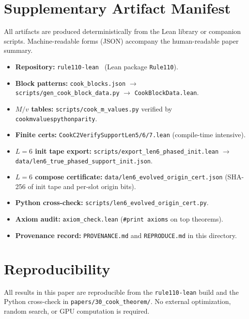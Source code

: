 \documentclass[11pt]{article}
\theoremstyle{remark}
\newcommand{\lean}[1]{%
  \penalty-100
  \begingroup\def\_{\textunderscore\allowbreak}\texttt{#1}\endgroup}
\begin{document}
\begin{appendices}
\section{Supplementary Artifact Manifest}
\label{app:artifacts}

All artifacts are produced deterministically from the Lean library or companion scripts.
Machine-readable forms (JSON) accompany the human-readable paper summary.

\begin{itemize}[leftmargin=1.2em,itemsep=0.2em]
  \item \textbf{Repository:} \texttt{rule110-lean}~\cite{rule110-lean} (Lean package \texttt{Rule110}).
  \item \textbf{Block patterns:} \texttt{cook\_blocks.json} $\to$\\
    \texttt{scripts/gen\_cook\_block\_data.py} $\to$ \texttt{CookBlockData.lean}.
  \item \textbf{$M/v$ tables:} \texttt{scripts/cook\_m\_values.py} verified by
    \lean{cook\_m\_values\_python\_parity}.
  \item \textbf{Finite certs:} \texttt{CookC2VerifySupportLen5/6/7.lean}
    (compile-time intensive).
  \item \textbf{$L{=}6$ init tape export:}
    \texttt{scripts/export\_len6\_phased\_init.lean} $\to$\\
    \texttt{data/len6\_true\_phased\_support\_init.json}.
  \item \textbf{$L{=}6$ compose certificate:}
    \texttt{data/len6\_evolved\_origin\_cert.json}
    (SHA-256 of init tape and per-slot origin bits).
  \item \textbf{Python cross-check:} \texttt{scripts/len6\_evolved\_origin\_cert.py}.
  \item \textbf{Axiom audit:} \texttt{axiom\_check.lean} (\texttt{\#print axioms} on top theorems).
  \item \textbf{Provenance record:} \texttt{PROVENANCE.md} and \texttt{REPRODUCE.md} in this directory.
\end{itemize}

\section{Reproducibility}
\label{app:reproduce}

All results in this paper are reproducible from the \texttt{rule110-lean} build and the
Python cross-check in \texttt{papers/30\_cook\_theorem/}.
No external optimization, random search, or GPU computation is required.


\end{appendices}
\end{document}

